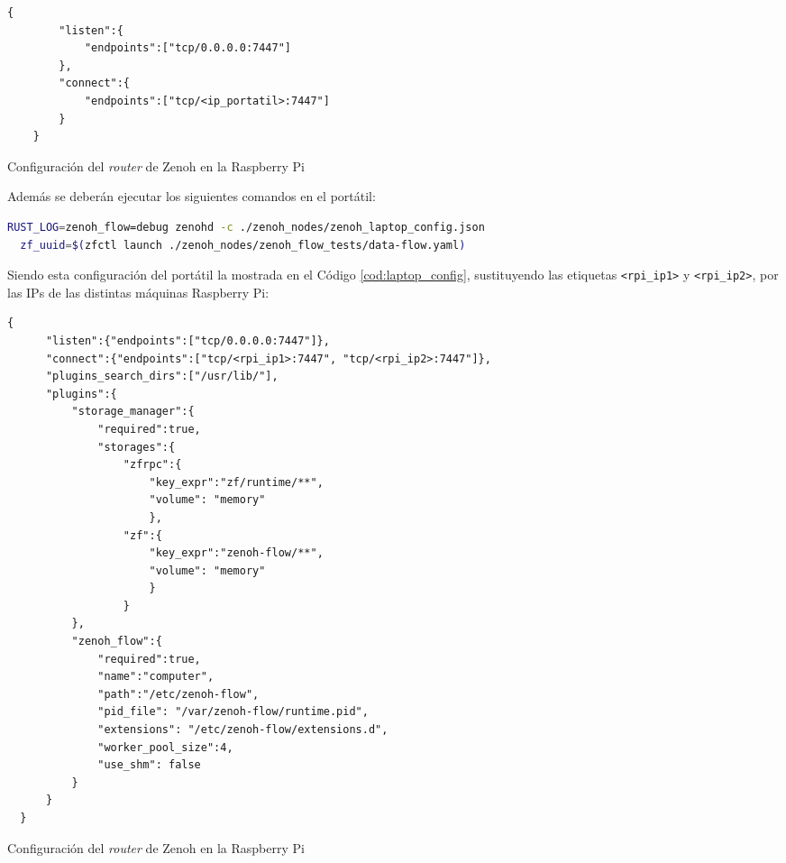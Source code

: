 \begin{code}[h!]
  \begin{lstlisting}[style=json]
    {
        "listen":{
            "endpoints":["tcp/0.0.0.0:7447"]
        },
        "connect":{
            "endpoints":["tcp/<ip_portatil>:7447"]
        }
    }
  \end{lstlisting}
\caption[Configuración del \textit{router} de Zenoh en la Raspberry Pi]{Configuración del \textit{router} de Zenoh en la Raspberry Pi}
\label{cod:rpi_config}
\end{code}


Además se deberán ejecutar los siguientes comandos en el portátil:
\begin{lstlisting}[language=bash]
  RUST_LOG=zenoh_flow=debug zenohd -c ./zenoh_nodes/zenoh_laptop_config.json
  zf_uuid=$(zfctl launch ./zenoh_nodes/zenoh_flow_tests/data-flow.yaml)
\end{lstlisting}

Siendo esta configuración del portátil la mostrada en el Código
\ref{cod:laptop_config}, sustituyendo las etiquetas \verb|<rpi_ip1>| y
\verb|<rpi_ip2>|, por las IPs de las distintas máquinas Raspberry Pi:
\\

\begin{code}[h!]
  \begin{lstlisting}[style=json]
    {
      "listen":{"endpoints":["tcp/0.0.0.0:7447"]},
      "connect":{"endpoints":["tcp/<rpi_ip1>:7447", "tcp/<rpi_ip2>:7447"]},
      "plugins_search_dirs":["/usr/lib/"],
      "plugins":{
          "storage_manager":{
              "required":true,
              "storages":{
                  "zfrpc":{
                      "key_expr":"zf/runtime/**",
                      "volume": "memory"
                      },
                  "zf":{
                      "key_expr":"zenoh-flow/**",
                      "volume": "memory"
                      }
                  }
          },
          "zenoh_flow":{
              "required":true,
              "name":"computer",
              "path":"/etc/zenoh-flow",
              "pid_file": "/var/zenoh-flow/runtime.pid",
              "extensions": "/etc/zenoh-flow/extensions.d",
              "worker_pool_size":4,
              "use_shm": false
          }
      }
  }
  \end{lstlisting}
\caption[Configuración del \textit{router} de Zenoh en la Raspberry Pi]{Configuración del \textit{router} de Zenoh en la Raspberry Pi}
\label{cod:laptop_config}
\end{code}

